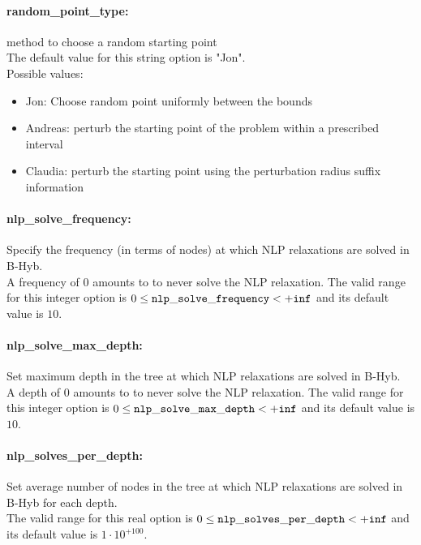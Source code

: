 \paragraph{random\_point\_type:}\label{sec:random_point_type} method to choose a random starting point $\;$ \\

The default value for this string option is "Jon".
\\ 
Possible values:
\begin{itemize}
   \item Jon: Choose random point uniformly between the bounds
   \item Andreas: perturb the starting point of the problem
within a prescribed interval
   \item Claudia: perturb the starting point using the
perturbation radius suffix information
\end{itemize}

\paragraph{nlp\_solve\_frequency:}\label{sec:nlp_solve_frequency} Specify the frequency (in terms of nodes) at which NLP relaxations are solved in B-Hyb. $\;$ \\
 A frequency of 0 amounts to to never solve the
NLP relaxation. The valid range for this integer option is
$0 \le {\tt nlp\_solve\_frequency } <  {\tt +inf}$
and its default value is $10$.


\paragraph{nlp\_solve\_max\_depth:}\label{sec:nlp_solve_max_depth} Set maximum depth in the tree at which NLP relaxations are solved in B-Hyb. $\;$ \\
 A depth of 0 amounts to to never solve the NLP
relaxation. The valid range for this integer option is
$0 \le {\tt nlp\_solve\_max\_depth } <  {\tt +inf}$
and its default value is $10$.


\paragraph{nlp\_solves\_per\_depth:}\label{sec:nlp_solves_per_depth} Set average number of nodes in the tree at which NLP relaxations are solved in B-Hyb for each depth. $\;$ \\
 The valid range for this real option is 
$0 \le {\tt nlp\_solves\_per\_depth } <  {\tt +inf}$
and its default value is $1 \cdot 10^{+100}$.


